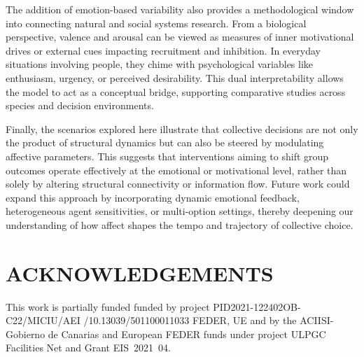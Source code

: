 \documentclass[a4paper,twoside]{article}
\begin{document}
The addition of emotion-based variability also provides a methodological window into connecting natural and social systems research. From a biological perspective, valence and arousal can be viewed as measures of inner motivational drives or external cues impacting recruitment and inhibition. In everyday situations involving people, they chime with psychological variables like enthusiasm, urgency, or perceived desirability. This dual interpretability allows the model to act as a conceptual bridge, supporting comparative studies across species and decision environments.

Finally, the scenarios explored here illustrate that collective decisions are not only the product of structural dynamics but can also be steered by modulating affective parameters. 
This suggests that interventions aiming to shift group outcomes operate effectively at the emotional or motivational level, rather than solely by altering structural connectivity or information flow. 
Future work could expand this approach by incorporating dynamic emotional feedback, heterogeneous agent sensitivities, or multi-option settings, thereby deepening our understanding of how affect shapes the tempo and trajectory of collective choice.


\section*{\uppercase{Acknowledgements}}


This work is partially funded funded by project PID2021-122402OB-C22/MICIU/AEI
/10.13039/501100011033 FEDER, UE and by the ACIISI-Gobierno de Canarias and European FEDER funds under project ULPGC Facilities Net and Grant \mbox{EIS 2021 04}. 
\end{document}
